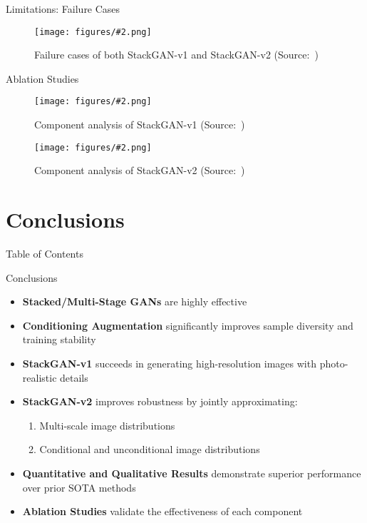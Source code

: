 \documentclass{beamer}
\newcommand{\paperfigure}[3][width=\textwidth]{%
    \begin{figure}%
        \centering%
        \texttt{[image: figures/\#2.png]}%
        \caption{#3 (Source:~\cite{stackgan++})}%
    \end{figure}%
}
\begin{document}
\begin{frame}{Limitations: Failure Cases}
    \paperfigure[width=\textwidth]{failure_cases}{Failure cases of both StackGAN-v1 and StackGAN-v2}
\end{frame}

\begin{frame}{Ablation Studies}
    \paperfigure[width=0.5\textwidth]{ablation_v1}{Component analysis of StackGAN-v1}
    \paperfigure[width=0.9\textwidth]{ablation_v2}{Component analysis of StackGAN-v2}
\end{frame}


\section{Conclusions}
\begin{frame}{Table of Contents}
    \tableofcontents[currentsection]
\end{frame}

\begin{frame}{Conclusions}
    \begin{itemize}
        \item \textbf{Stacked/Multi-Stage GANs} are highly effective
        \item \textbf{Conditioning Augmentation} significantly improves sample diversity and training stability
        \item \textbf{StackGAN-v1} succeeds in generating high-resolution images with photo-realistic details
        \item \textbf{StackGAN-v2} improves robustness by jointly approximating:
        \begin{enumerate}
            \item Multi-scale image distributions
            \item Conditional and unconditional image distributions
        \end{enumerate}
        \item \textbf{Quantitative and Qualitative Results} demonstrate superior performance over prior SOTA methods
        \item \textbf{Ablation Studies} validate the effectiveness of each component
    \end{itemize}
\end{frame}
\end{document}
